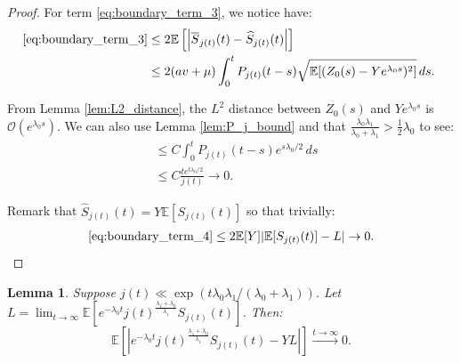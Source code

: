 \documentclass{article}
\numberwithin{equation}{section}
\newtheorem{lemma}{Lemma}
\begin{document}
\begin{proof}
    For term \ref{eq:boundary_term_3}, we notice have:
    \begin{align*}
      \ref{eq:boundary_term_3}&\leq 2\mathbb{E}\left[\left|\overline{S}_{j(t)}(t)-\widehat{S}_{j(t)}(t)\right|\right]\\
      &\leq 2(av+\mu)\int_0^t P_{j(t)}(t-s)\sqrt{\mathbb{E}[(Z_0(s)-Ye^{\lambda_0 s})^2]}\,ds.\
    \end{align*}

    From Lemma \ref{lem:L2_distance}, the $L^2$ distance between $Z_0(s)$ and $Ye^{\lambda_0 s}$ is $\mathcal{O}(e^{\lambda_0 s})$. We can also use Lemma \ref{lem:P_j_bound} and that $\frac{\lambda_0\lambda_1}{\lambda_0+\lambda_1}>\frac{1}{2}\lambda_0$ to see:
    \begin{align*}
      &\leq C\int_0^t P_{j(t)}(t-s)e^{s\lambda_0/2}\,ds\\
      &\leq C\frac{te^{t\lambda_0/2}}{j(t)}\to 0.
    \end{align*}

    Remark that $\widehat{S}_{j(t)}(t)=Y\mathbb{E}[S_{j(t)}(t)]$ so that trivially:
    \begin{align*}
      \ref{eq:boundary_term_4}\leq 2\mathbb{E}[Y]|\mathbb{E}[S_{j(t)}(t)]-L|\to 0.
    \end{align*}

\end{proof}

\begin{lemma}\label{lem:sparsity_part3}
Suppose $j(t)\ll \exp(t\lambda_0\lambda_1/(\lambda_0+\lambda_1))$. Let $L=\lim_{t\to\infty}\mathbb{E}[e^{-\lambda_0 t}j(t)^{\frac{\lambda_1+\lambda_0}{\lambda_1}}S_{j(t)}(t)]$. Then:
\[\mathbb{E}[|e^{-\lambda_0 t}j(t)^{\frac{\lambda_1+\lambda_0}{\lambda_1}}S_{j(t)}(t)-YL|]\overset{t\to\infty}{\to}0.\]
\end{lemma}
\end{document}
